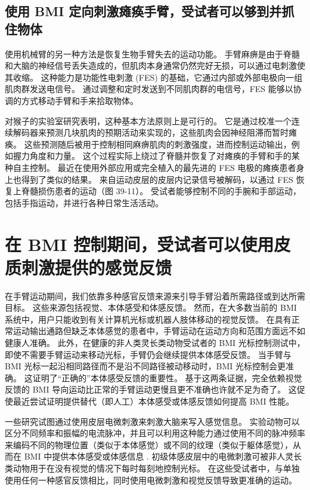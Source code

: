 \subsection{使用 BMI 定向刺激瘫痪手臂，受试者可以够到并抓住物体}
使用机械臂的另一种方法是恢复生物手臂失去的运动功能。 
手臂麻痹是由于脊髓和大脑的神经信号丢失造成的，但肌肉本身通常仍然完好无损，可以通过电刺激使其收缩。 
这种能力是功能性电刺激 (FES) 的基础，它通过内部或外部电极向一组肌肉群发送电信号。 
通过调整和定时发送到不同肌肉群的电信号，FES 能够以协调的方式移动手臂和手来拾取物体。


对猴子的实验室研究表明，这种基本方法原则上是可行的。 
它是通过校准一个连续解码器来预测几块肌肉的预期活动来实现的，这些肌肉会因神经阻滞而暂时瘫痪。 
这些预测随后被用于控制相同麻痹肌肉的刺激强度，进而控制运动输出，例如握力角度和力量。 
这个过程实际上绕过了脊髓并恢复了对瘫痪的手臂和手的某种自主控制。 
最近在使用外部应用或完全植入的最先进的 FES 电极的瘫痪患者身上也得到了类似的结果。 
来自运动皮层的皮层内记录信号被解码，以通过 FES 恢复上脊髓损伤患者的运动（图 39-11）。 
受试者能够控制不同的手腕和手部运动，包括手指运动，并进行各种日常生活活动。


\section{在 BMI 控制期间，受试者可以使用皮质刺激提供的感觉反馈}
在手臂运动期间，我们依靠多种感官反馈来源来引导手臂沿着所需路径或到达所需目标。 
这些来源包括视觉、本体感受和体感反馈。 
然而，在大多数当前的 BMI 系统中，用户只能收到有关计算机光标或机器人肢体移动的视觉反馈。 
在具有正常运动输出通路但缺乏本体感觉的患者中，手臂运动在运动方向和范围方面远不如健康人准确。 
此外，在健康的非人类灵长类动物受试者的 BMI 光标控制测试中，即使不需要手臂运动来移动光标，手臂仍会继续提供本体感受反馈。 
当手臂与 BMI 光标一起沿相同路径而不是沿不同路径被动移动时，BMI 光标控制会更准确。 
这证明了“正确的”本体感受反馈的重要性。 
基于这两条证据，完全依赖视觉反馈的 BMI 导向运动比正常的手臂运动更慢且更不准确也许就不足为奇了。 
这促使最近尝试证明提供替代（即人工）本体感受或体感反馈如何提高 BMI 性能。


一些研究试图通过使用皮层电微刺激来刺激大脑来写入感觉信息。
实验动物可以区分不同频率和振幅的电流脉冲，并且可以利用这种能力通过使用不同的脉冲频率来编码不同的物理位置（类似于本体感觉）或不同的纹理（类似于躯体感觉），从而在 BMI 中提供本体感受或体感信息 . 初级体感皮层中的电微刺激可被非人灵长类动物用于在没有视觉的情况下每时每刻地控制光标。 
在这些受试者中，与单独使用任何一种感官反馈相比，同时使用电微刺激和视觉反馈导致更准确的运动。


